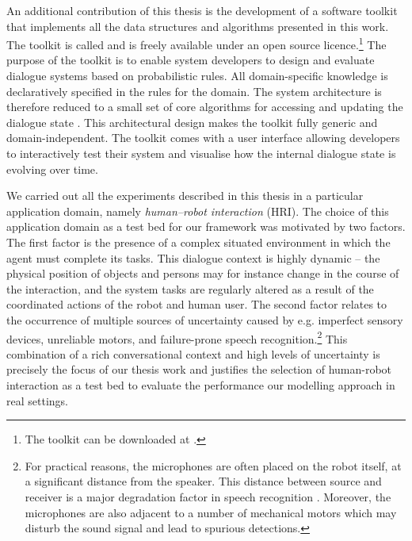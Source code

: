An additional contribution of this thesis is the development of a software toolkit that implements all the data structures and algorithms presented in this work. The toolkit is called \opendial  and is freely available under an open source licence.\footnote{The toolkit can be downloaded at . } The purpose of the toolkit is to enable system developers to design and evaluate dialogue systems based on probabilistic rules. All domain-specific knowledge is declaratively specified in the rules for the domain. The system architecture is therefore reduced to a small set of core algorithms for accessing and updating the dialogue state \citep{lison-semdial2012}. This architectural design makes the toolkit fully generic and domain-independent. The \opendial toolkit comes with a user interface allowing developers to interactively test their system and visualise how the internal dialogue state is evolving over time.  %

We carried out all the experiments described in this thesis in a particular application domain, namely \textit{human--robot interaction}  (HRI).  The choice of this application domain as a test bed for our framework was motivated by two factors.  The first factor is the presence of a complex situated environment in which the agent must complete its tasks.  This dialogue context is highly dynamic -- the physical position of objects and persons may for instance change in the course of the interaction, and the system tasks are regularly altered as a result of the coordinated actions of the robot and human user. The second factor relates to the occurrence of multiple sources of uncertainty caused by e.g. imperfect sensory devices, unreliable motors, and failure-prone speech recognition.\footnote{For practical reasons, the microphones are often placed on the robot itself, at a significant distance from the speaker.  This distance between source and receiver is a major degradation factor in speech recognition \citep{wolfel2009distant}.  Moreover, the microphones are also adjacent to a number of mechanical motors which may disturb the sound signal and lead to spurious detections.} This combination of a rich conversational context and high levels of uncertainty is precisely the focus of our thesis work and justifies the selection of  human-robot interaction as a test bed to evaluate the performance our modelling approach in real settings.

